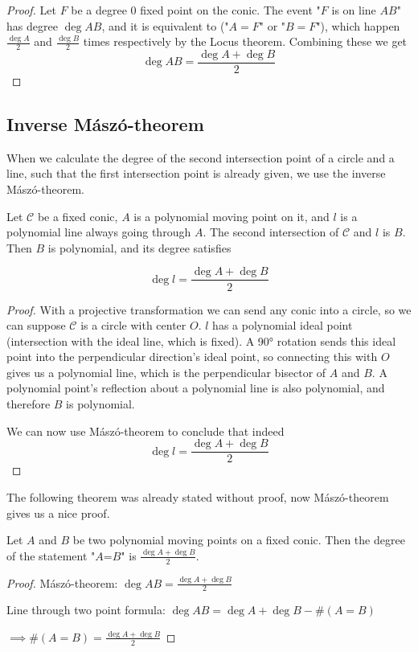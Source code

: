 \documentclass[a4paper]{article}
\begin{document}
\begin{proof}
    Let $F$ be a degree 0 fixed point on the conic.
    The event "$F$ is on line $AB$" has degree $\deg AB$, and it is equivalent to ("$A=F$" or "$B=F$"), which happen $\frac{\deg A}{2}$ and $\frac{\deg B}{2}$ times respectively by the Locus theorem. Combining these we get 
    $$\deg AB = \frac{\deg A+\deg B}{2}$$
    
\end{proof}

\subsection{Inverse Mászó-theorem}\label{invmaszo}

When we calculate the degree of the second intersection point of a circle and a line, such that the first intersection point is already given, we use the inverse Mászó-theorem.

\begin{theorem} 

    Let $\mathcal{C}$ be a fixed conic, $A$ is a polynomial moving point on it, and $l$ is a polynomial line always going through $A$. The second intersection of $\mathcal{C}$ and $l$ is $B$. Then $B$ is polynomial, and its degree satisfies

    $$\deg l = \frac{\deg A+\deg B}{2}$$
    
\end{theorem}
\begin{proof}

    With a projective transformation we can send any conic into a circle, so we can suppose $\mathcal{C}$ is a circle with center $O$. $l$ has a polynomial ideal point (intersection with the ideal line, which is fixed). A 90° rotation sends this ideal point into the perpendicular direction's ideal point, so connecting this with $O$ gives us a polynomial line, which is the perpendicular bisector of $A$ and $B$. A polynomial point's reflection about a polynomial line is also polynomial, and therefore $B$ is polynomial.
    
    We can now use Mászó-theorem to conclude that indeed $$\deg l = \frac{\deg A+\deg B}{2}$$
\end{proof}

The following theorem was already stated without proof, now Mászó-theorem gives us a nice proof.
\begin{theorem}
    Let $A$ and $B$ be two polynomial moving points on a fixed conic. Then the degree of the statement "$A$=$B$" is $\frac{\deg A+ \deg B}{2}$.
\end{theorem}
\begin{proof}
    Mászó-theorem:
    $\deg AB=\frac{\deg A+\deg B}{2}$
    
    Line through two point formula:
    $\deg AB=\deg A+\deg B-\#(A=B)$
    
    $\implies \#(A=B)=\frac{\deg A+\deg B}{2}$
\end{proof}
\end{document}

